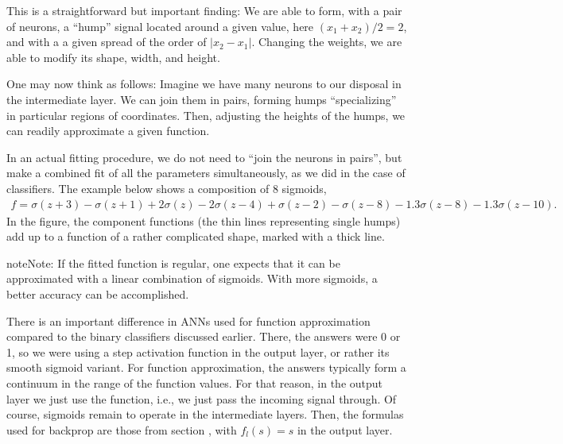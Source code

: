 \documentclass[letterpaper,10pt,english]{jupyterBook}
\begin{document}
\noindent{}

\sphinxAtStartPar
This is a straightforward but important finding:
We are able to form, with a pair of neurons, a “hump” signal located around a given value, here \( (x_1 + x_2) / 2 = 2\), and with a a given spread of the order of \(|x_2-x_1|\). Changing the weights, we are able to modify its shape, width, and height.

\sphinxAtStartPar
One may now think as follows: Imagine we have many neurons to our disposal in the intermediate layer. We can join them in pairs, forming humps “specializing” in particular regions of coordinates. Then, adjusting the heights of the humps, we can readily approximate a given function.

\sphinxAtStartPar
In an actual fitting procedure, we do not need to “join the neurons in pairs”, but make a combined fit of all the parameters simultaneously, as we did in the case of classifiers. The example below shows a composition of 8 sigmoids,
\begin{equation*}
\begin{split}
f = \sigma(z+3)-\sigma(z+1)+2 \sigma(z)-2\sigma(z-4)+
      \sigma(z-2)-\sigma(z-8)-1.3 \sigma(z-8)-1.3\sigma(z-10). 
\end{split}
\end{equation*}
\sphinxAtStartPar
In the figure, the component functions (the thin lines representing single humps) add up to a function of a rather complicated shape, marked with a thick line.

\noindent{}

\begin{sphinxadmonition}{note}{Note:}
\sphinxAtStartPar
If the fitted function is regular, one expects that it can be approximated with a linear combination of sigmoids. With more sigmoids, a better accuracy can be accomplished.
\end{sphinxadmonition}

\sphinxAtStartPar
There is an important difference in ANNs used for function approximation compared to the binary classifiers discussed earlier. There, the answers were 0 or 1, so we were using a step activation function in the output layer, or rather its smooth sigmoid variant. For function approximation, the answers typically form a continuum in the range of the function values. For that reason, in the output layer we just use the  function, i.e., we just pass the incoming signal through. Of course, sigmoids remain to operate in the intermediate layers. Then, the formulas used for backprop are those from section {\hyperref[\detokenize{docs/backprop:bpa-lab}]{}}, with \(f_l(s)=s\) in the output layer.
\end{document}
